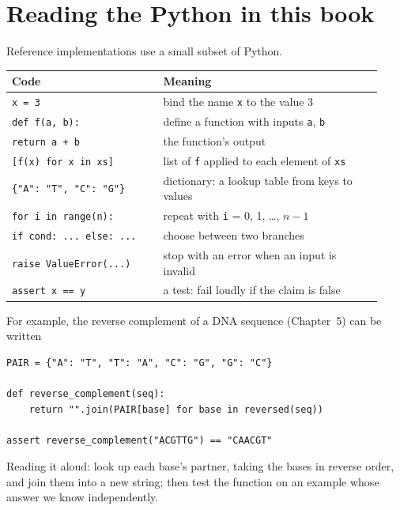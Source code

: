 \section{Reading the Python in this book}
Reference implementations use a small subset of Python.
\begin{center}
\small
\begin{tabular}{@{}p{0.38\linewidth}p{0.55\linewidth}@{}}
\toprule
Code & Meaning\\
\midrule
\texttt{x = 3} & bind the name \texttt{x} to the value 3\\
\texttt{def f(a, b):} & define a function with inputs \texttt{a}, \texttt{b}\\
\texttt{return a + b} & the function's output\\
\texttt{[f(x) for x in xs]} & list of \texttt{f} applied to each element of \texttt{xs}\\
\texttt{\{"A": "T", "C": "G"\}} & dictionary: a lookup table from keys to values\\
\texttt{for i in range(n):} & repeat with \texttt{i} = 0, 1, \ldots, $n-1$\\
\texttt{if cond: ... else: ...} & choose between two branches\\
\texttt{raise ValueError(...)} & stop with an error when an input is invalid\\
\texttt{assert x == y} & a test: fail loudly if the claim is false\\
\bottomrule
\end{tabular}
\end{center}
For example, the reverse complement of a DNA sequence (Chapter~5) can be
written
\begin{verbatim}
PAIR = {"A": "T", "T": "A", "C": "G", "G": "C"}

def reverse_complement(seq):
    return "".join(PAIR[base] for base in reversed(seq))

assert reverse_complement("ACGTTG") == "CAACGT"
\end{verbatim}
Reading it aloud: look up each base's partner, taking the bases in reverse
order, and join them into a new string; then test the function on an example
whose answer we know independently.
